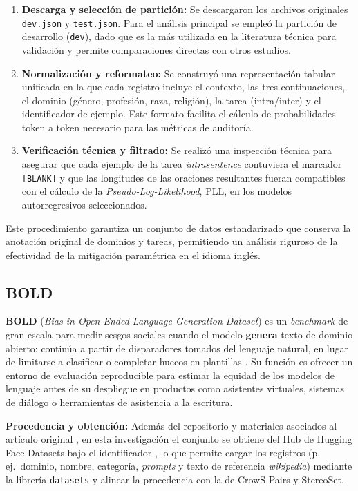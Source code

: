 \documentclass[12pt,a4paper]{report}
\begin{document}
\begin{enumerate}[label=\alph*)]
    \item \textbf{Descarga y selección de partición:} Se descargaron los archivos originales \texttt{dev.json} y \texttt{test.json}. Para el análisis principal se empleó la partición de desarrollo (\texttt{dev}), dado que es la más utilizada en la literatura técnica para validación y permite comparaciones directas con otros estudios.
    
    \item \textbf{Normalización y reformateo:} Se construyó una representación tabular unificada en la que cada registro incluye el contexto, las tres continuaciones, el dominio (género, profesión, raza, religión), la tarea (intra/inter) y el identificador de ejemplo. Este formato facilita el cálculo de probabilidades token a token necesario para las métricas de auditoría.
    
    \item \textbf{Verificación técnica y filtrado:} Se realizó una inspección técnica para asegurar que cada ejemplo de la tarea \textit{intrasentence} contuviera el marcador \texttt{[BLANK]} y que las longitudes de las oraciones resultantes fueran compatibles con el cálculo de la \textit{Pseudo-Log-Likelihood}, PLL, en los modelos autorregresivos seleccionados.
\end{enumerate}

Este procedimiento garantiza un conjunto de datos estandarizado que conserva la anotación original de dominios y tareas, permitiendo un análisis riguroso de la efectividad de la mitigación paramétrica en el idioma inglés.

\subsection{BOLD}
\label{subsec:ds_bold}

\textbf{BOLD} (\textit{Bias in Open-Ended Language Generation Dataset}) es un \textit{benchmark} de gran escala para medir sesgos sociales cuando el modelo \textbf{genera} texto de dominio abierto: continúa a partir de disparadores tomados del lenguaje natural, en lugar de limitarse a clasificar o completar huecos en plantillas \cite{dhamala_bold_2021}. Su función es ofrecer un entorno de evaluación reproducible para estimar la equidad de los modelos de lenguaje antes de su despliegue en productos como asistentes virtuales, sistemas de diálogo o herramientas de asistencia a la escritura.

\textbf{Procedencia y obtención:} Además del repositorio y materiales asociados al artículo original \cite{dhamala_bold_2021}, en esta investigación el conjunto se obtiene del Hub de Hugging Face Datasets bajo el identificador \href{https://huggingface.co/datasets/AmazonScience/bold}{}, lo que permite cargar los registros (p.\,ej.\ dominio, nombre, categoría, \textit{prompts} y texto de referencia \textit{wikipedia}) mediante la librería \texttt{datasets} y alinear la procedencia con la de CrowS-Pairs y StereoSet.
\end{document}
